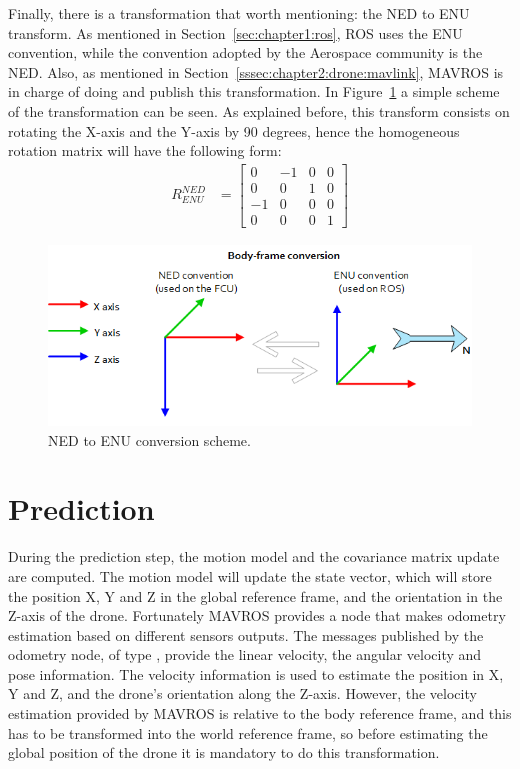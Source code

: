 Finally, there is a transformation that worth mentioning: the \ac{NED} to \ac{ENU} transform. As mentioned in Section~\ref{sec:chapter1:ros}, ROS uses the ENU convention, while the convention adopted by the Aerospace community is the NED. Also, as mentioned in Section~\ref{sssec:chapter2:drone:mavlink}, MAVROS is in charge of doing and publish this transformation. In Figure~\ref{fig:chapter2:drone:frames:enu2ned} a simple scheme of the transformation can be seen. As explained before, this transform consists on rotating the X-axis and the Y-axis by 90 degrees, hence the homogeneous rotation matrix will have the following form:
\begin{align}
    R_{ENU}^{NED} & = \begin{bmatrix}
        0 & -1 & 0 & 0 \\
        0 & 0 & 1 & 0 \\
        -1 & 0 & 0 & 0 \\
        0 & 0 & 0 & 1
    \end{bmatrix}
\end{align}


\begin{figure}[h]
    \centering
    \includegraphics[width=\textwidth]{Figures/fig6-ned2enu.png}
    \caption{NED to ENU conversion scheme. \cite{mavros}}
    \label{fig:chapter2:drone:frames:enu2ned}
\end{figure}

\section{Prediction}
\label{sec:chapter2:prediction}
During the prediction step, the motion model and the covariance matrix update are computed. The motion model will update the state vector, which will store the position X, Y and Z in the global reference frame, and the orientation in the Z-axis of the drone. Fortunately MAVROS provides a node that makes odometry estimation based on different sensors outputs. The messages published by the odometry node, of type , provide the linear velocity, the angular velocity and pose information. The velocity information is used to estimate the position in X, Y and Z, and the drone's orientation along the Z-axis. However, the velocity estimation provided by MAVROS is relative to the body reference frame, and this has to be transformed into the world reference frame, so before estimating the global position of the drone it is mandatory to do this transformation.

